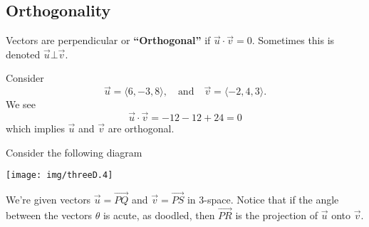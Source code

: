 \subsection{Orthogonality}

\M
Vectors are perpendicular or \textbf{``Orthogonal''} if
$\vec{u}\cdot\vec{v}=0$. Sometimes this is denoted $\vec{u}\bot\vec{v}$.

\begin{example}
Consider
\begin{equation}
\vec{u}=\langle6,-3,8\rangle,\quad\mbox{and}\quad
\vec{v}=\langle-2,4,3\rangle.
\end{equation}
We see
\begin{equation}
\vec{u}\cdot\vec{v}=-12-12+24=0
\end{equation}
which implies $\vec{u}$ and $\vec{v}$ are orthogonal.
\end{example}

\M
Consider the following diagram
\begin{center}
\texttt{[image: img/threeD.4]}
\end{center}
We're given vectors $\vec{u}=\overrightarrow{PQ}$ and
$\vec{v}=\overrightarrow{PS}$ in 3-space. Notice that if the
angle between the vectors $\theta$ is acute, as doodled, then
$\overrightarrow{PR}$ is the projection of $\vec{u}$ onto
$\vec{v}$. 

